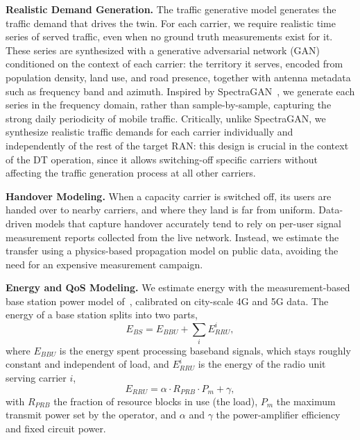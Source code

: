\documentclass[sigconf, 10pt, review]{acmart}
\begin{document}
\noindent\textbf{Realistic Demand Generation.}
The traffic generative model generates the traffic demand that drives the twin. For each carrier, we require realistic time series of served traffic, even when no ground truth measurements exist for it. These series are synthesized with a generative adversarial network (GAN) conditioned on the context of each carrier: the territory it serves, encoded from population density, land use, and road presence, together with antenna metadata such as frequency band and azimuth. Inspired by SpectraGAN~\cite{xu2021spectragan}, we generate each series in the frequency domain, rather than sample-by-sample, capturing the strong daily periodicity of mobile traffic. Critically, unlike SpectraGAN, we synthesize realistic traffic demands for each carrier individually and independently of the rest of the target RAN: this design is crucial in the context of the \ac{DT} operation, since it allows switching-off specific carriers without affecting the traffic generation process at all other carriers.


\noindent\textbf{Handover Modeling.}
When a capacity carrier is switched off, its users are handed over to nearby carriers, and where they land is far from uniform. Data-driven models that capture handover accurately tend to rely on per-user signal measurement reports collected from the live network. Instead, we estimate the transfer using a physics-based propagation model on public data, avoiding the need for an expensive measurement campaign.

\noindent\textbf{Energy and \ac{QoS} Modeling.}
We estimate energy with the measurement-based base station
power model of~\cite{energy_consumption_formula}, calibrated on city-scale 4G and 5G
data. 
The energy of a base station splits into two parts,
\begin{equation}
  E_{BS} = E_{BBU} + \sum_{i} E^{i}_{RRU},
  \label{eq:e_bs}
\end{equation}
where $E_{BBU}$ is the energy spent processing baseband signals, which stays roughly constant and independent of load, and $E^{i}_{RRU}$ is the energy of the radio unit serving carrier $i$,
\begin{equation}
  E_{RRU} = \alpha \cdot R_{PRB} \cdot P_{m} + \gamma,
  \label{eq:e_rru}
\end{equation}
with $R_{PRB}$ the fraction of resource blocks in use (the load), $P_{m}$ the maximum transmit power set by the operator, and $\alpha$ and $\gamma$ the power-amplifier efficiency and fixed circuit power. 
\end{document}
